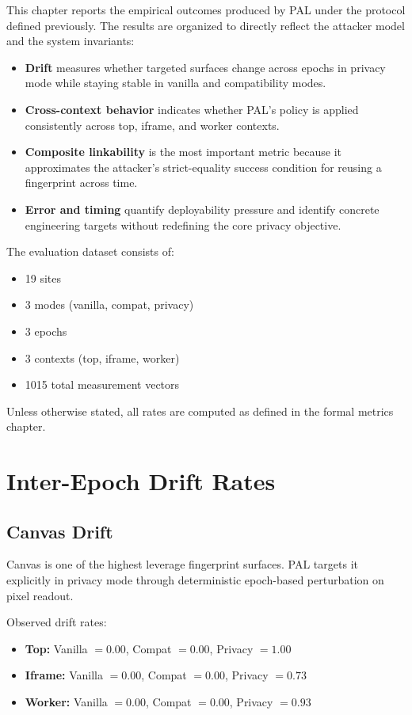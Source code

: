 \documentclass[11pt]{report}
\begin{document}
This chapter reports the empirical outcomes produced by PAL under the protocol defined previously. The results are organized to directly reflect the attacker model and the system invariants:

\begin{itemize}
    \item \textbf{Drift} measures whether targeted surfaces change across epochs in privacy mode while staying stable in vanilla and compatibility modes.
    \item \textbf{Cross-context behavior} indicates whether PAL’s policy is applied consistently across top, iframe, and worker contexts.
    \item \textbf{Composite linkability} is the most important metric because it approximates the attacker’s strict-equality success condition for reusing a fingerprint across time.
    \item \textbf{Error and timing} quantify deployability pressure and identify concrete engineering targets without redefining the core privacy objective.
\end{itemize}

The evaluation dataset consists of:
\begin{itemize}
    \item 19 sites
    \item 3 modes (vanilla, compat, privacy)
    \item 3 epochs
    \item 3 contexts (top, iframe, worker)
    \item 1015 total measurement vectors
\end{itemize}

Unless otherwise stated, all rates are computed as defined in the formal metrics chapter.

\section{Inter-Epoch Drift Rates}

\subsection{Canvas Drift}

Canvas is one of the highest leverage fingerprint surfaces. PAL targets it explicitly in privacy mode through deterministic epoch-based perturbation on pixel readout.

Observed drift rates:

\begin{itemize}
    \item \textbf{Top:} Vanilla $=0.00$, Compat $=0.00$, Privacy $=1.00$
    \item \textbf{Iframe:} Vanilla $=0.00$, Compat $=0.00$, Privacy $=0.73$
    \item \textbf{Worker:} Vanilla $=0.00$, Compat $=0.00$, Privacy $=0.93$
\end{itemize}
\end{document}
